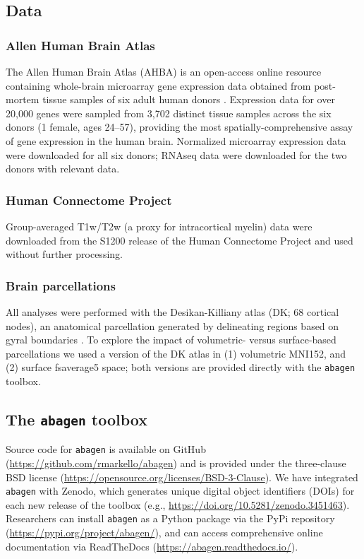 \documentclass[12pt,aps,pra,reprint,showkeys]{revtex4-1}
\begin{document}
\subsection*{Data}

\subsubsection*{Allen Human Brain Atlas}

The Allen Human Brain Atlas (AHBA) is an open-access online resource containing whole-brain microarray gene expression data obtained from post-mortem tissue samples of six adult human donors \citep[\url{https://human.brain-map.org};][]{allenwhitepaper, hawrylycz2012nature}.
Expression data for over 20,000 genes were sampled from 3,702 distinct tissue samples across the six donors (1 female, ages 24--57), providing the most spatially-comprehensive assay of gene expression in the human brain.
Normalized microarray expression data were downloaded for all six donors; RNAseq data were downloaded for the two donors with relevant data.

\subsubsection*{Human Connectome Project}

Group-averaged T1w/T2w (a proxy for intracortical myelin) data were downloaded from the S1200 release of the Human Connectome Project \citep[HCP;][]{vanessen2013neuroimage} and used without further processing.

\subsubsection*{Brain parcellations}

All analyses were performed with the Desikan-Killiany atlas (DK; 68 cortical nodes), an anatomical parcellation generated by delineating regions based on gyral boundaries \citep{desikan2006automated}.
To explore the impact of volumetric- versus surface-based parcellations we used a version of the DK atlas in (1) volumetric MNI152, and (2) surface fsaverage5 space; both versions are provided directly with the \texttt{abagen} toolbox.

\subsection*{The \texttt{abagen} toolbox}

Source code for \texttt{abagen} is available on GitHub (\url{https://github.com/rmarkello/abagen}) and is provided under the three-clause BSD license  (\url{https://opensource.org/licenses/BSD-3-Clause}).
We have integrated \texttt{abagen} with Zenodo, which generates unique digital object identifiers (DOIs) for each new release of the toolbox (e.g., \url{https://doi.org/10.5281/zenodo.3451463}).
Researchers can install \texttt{abagen} as a Python package via the PyPi repository (\url{https://pypi.org/project/abagen/}), and can access comprehensive online documentation via ReadTheDocs (\url{https://abagen.readthedocs.io/}).
\end{document}
